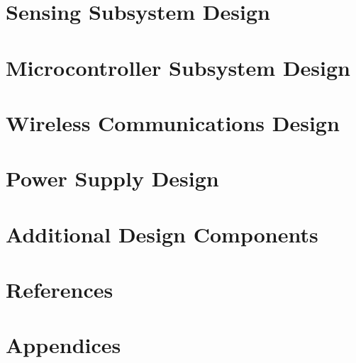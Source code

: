 \documentclass[12pt]{article}
\begin{document}
\section{Sensing  Subsystem Design}

\section{Microcontroller Subsystem Design}

\section{Wireless Communications Design}

\section{Power Supply Design}

\section{Additional Design Components}

\section{References}

\section{Appendices}
\end{document}
